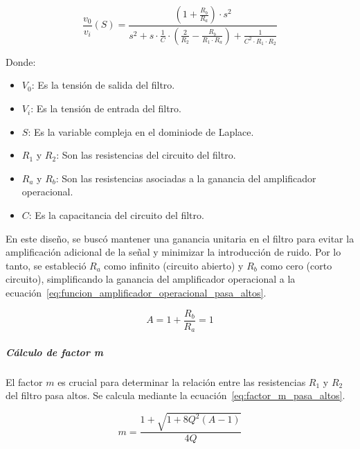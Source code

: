                    \begin{equation}
                        \label{eq:funcion_transferencia_pasa_altos}
                        \frac{v_0}{v_i}(S) = \frac{(1+\frac{R_b}{R_a}) \cdot s^2}{s^2 + s \cdot \frac{1}{C} \cdot (\frac{2}{R_2}- \frac{R_b}{R_1 \cdot R_a}) + \frac{1}{C^2 \cdot R_1 \cdot R_2}}
                    \end{equation}

                    Donde:
                    \begin{itemize}
                        \item $V_0$: Es la tensión de salida del filtro.
                        \item $V_i$: Es la tensión de entrada del filtro.
                        \item $S$: Es la variable compleja en el dominiode de Laplace.
                        \item $R_1$ y $R_2$: Son las resistencias del circuito del filtro.
                        \item $R_a$ y $R_b$: Son las resistencias asociadas a la ganancia del amplificador operacional.
                        \item $C$: Es la capacitancia del circuito del filtro.
                    \end{itemize}

                    En este diseño, se buscó mantener una ganancia unitaria en el filtro para evitar la amplificación adicional de la señal y minimizar la introducción de ruido. Por lo tanto, se estableció $R_a$ como infinito (circuito abierto) y $R_b$ como cero (corto circuito), simplificando la ganancia del amplificador operacional a la ecuación~\ref{eq:funcion_amplificador_operacional_pasa_altos}.

                    \begin{equation}
                        \label{eq:funcion_amplificador_operacional_pasa_altos}
                        A = 1 + \frac{R_b}{R_a} = 1
                    \end{equation}

                \subparagraph{Cálculo de factor m}
                    El factor $m$ es crucial para determinar la relación entre las resistencias $R_1$ y $R_2$ del filtro pasa altos. Se calcula mediante la ecuación~\ref{eq:factor_m_pasa_altos}.

                    \begin{equation}
                        \label{eq:factor_m_pasa_altos}
                        m = \frac{1+\sqrt{1+8Q^2(A-1)}}{4Q}
                    \end{equation}

